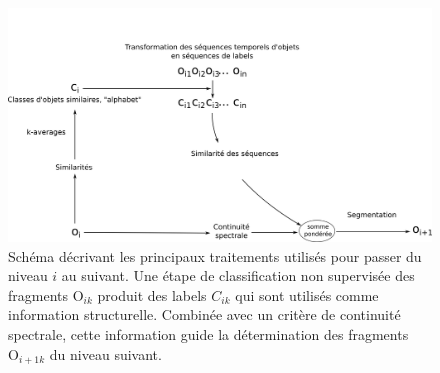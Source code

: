 \begin{figure}[t]
  \includegraphics[width=1\textwidth]{figures/alc_one_level.png}
  \caption{Schéma décrivant les principaux traitements utilisés pour passer du niveau $i$ au suivant. Une étape de classification non supervisée des fragments $\text{O}_{i k}$ produit des labels $C_{i k}$ qui sont utilisés comme information structurelle. Combinée avec un critère de continuité spectrale, cette information guide la détermination des fragments $\text{O}_{i+1 k}$ du niveau suivant.}\label{fig:alc}
\end{figure}



